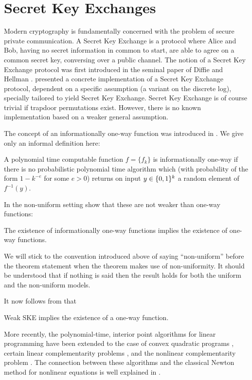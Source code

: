 \section{Secret Key Exchanges}
\label{SKE}

Modern cryptography is fundamentally concerned with the problem of
secure private communication.  A Secret Key Exchange is a protocol
where Alice and Bob, having no secret information in common to start,
are able to agree on a common secret key, conversing over a public
channel.  The notion of a Secret Key Exchange protocol was first
introduced in the seminal paper of Diffie and Hellman
\cite{dihe:newdir}. \cite{dihe:newdir} presented a concrete
implementation of a Secret Key Exchange protocol, dependent on a
specific assumption (a variant on the discrete log), specially
tailored to yield Secret Key Exchange. Secret Key Exchange is of
course trivial if trapdoor permutations exist. However, there is no
known implementation based on a weaker general assumption.

The concept of an informationally one-way function was introduced
in \cite{imlelu:oneway}. We give only an informal definition here:

\begin{defn} A polynomial time
computable function $f = \{f_k\}$ is informationally
one-way if there is no probabilistic polynomial time algorithm which
(with probability of the form $1 - k^{-e}$ for some $e > 0$)
returns on input $y \in \{0,1\}^{k}$ a random element of $f^{-1}(y)$.
\end{defn}
In the non-uniform setting \cite{imlelu:oneway} show that these are not
weaker than one-way functions:
\begin{thm}
\label{th-info-ow-ow}
The existence of informationally one-way functions
implies the existence of one-way functions.
\end{thm}
We will stick to the convention introduced above of saying
``non-uniform'' before the theorem statement when the theorem
makes use of non-uniformity. It should be understood that
if nothing is said then the result holds for both the uniform and
the non-uniform models.

It now follows from  that

\begin{thm}\label{th-weak-ske-owf} Weak SKE
implies the existence of a one-way function.
\end{thm}

More recently, the
polynomial-time, interior point algorithms for linear programming have
been extended to the case of convex quadratic programs
\cite{moad:quadpro,ye:intalg}, certain linear  complementarity
problems \cite{komiyo:lincomp,miyoki:lincomp}, and the nonlinear
complementarity problem \cite{komiyo:unipfunc}.  The connection between these
algorithms and the classical Newton method for  nonlinear equations is
well explained in \cite{komiyo:lincomp}.

